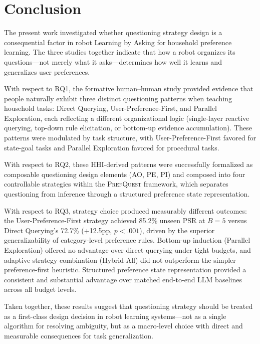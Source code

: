 \documentclass[manuscript,review,anonymous]{acmart}
\newcommand{\revstart}{\color{revcolor}}  %
\newcommand{\revend}{\color{black}}       %
\renewcommand{\revstart}{}
\renewcommand{\revend}{}
\begin{document}
\section{Conclusion}
\label{sec:conclusion}
{\revstart

The present work investigated whether questioning strategy design is a consequential factor in robot Learning by Asking for household preference learning. The three studies together indicate that how a robot organizes its questions---not merely what it asks---determines how well it learns and generalizes user preferences.

With respect to RQ1, the formative human--human study provided evidence that people naturally exhibit three distinct questioning patterns when teaching household tasks: Direct Querying, User-Preference-First, and Parallel Exploration, each reflecting a different organizational logic (single-layer reactive querying, top-down rule elicitation, or bottom-up evidence accumulation). These patterns were modulated by task structure, with User-Preference-First favored for state-goal tasks and Parallel Exploration favored for procedural tasks.

With respect to RQ2, these HHI-derived patterns were successfully formalized as composable questioning design elements (AO, PE, PI) and composed into four controllable strategies within the \textsc{PrefQuest} framework, which separates questioning from inference through a structured preference state representation.

With respect to RQ3, strategy choice produced measurably different outcomes: the User-Preference-First strategy achieved 85.2\% unseen PSR at $B=5$ versus Direct Querying's 72.7\% ($+$12.5pp, $p < .001$), driven by the superior generalizability of category-level preference rules. Bottom-up induction (Parallel Exploration) offered no advantage over direct querying under tight budgets, and adaptive strategy combination (Hybrid-All) did not outperform the simpler preference-first heuristic. Structured preference state representation provided a consistent and substantial advantage over matched end-to-end LLM baselines across all budget levels.

Taken together, these results suggest that questioning strategy should be treated as a first-class design decision in robot learning systems---not as a single algorithm for resolving ambiguity, but as a macro-level choice with direct and measurable consequences for task generalization.
\revend}
\end{document}
